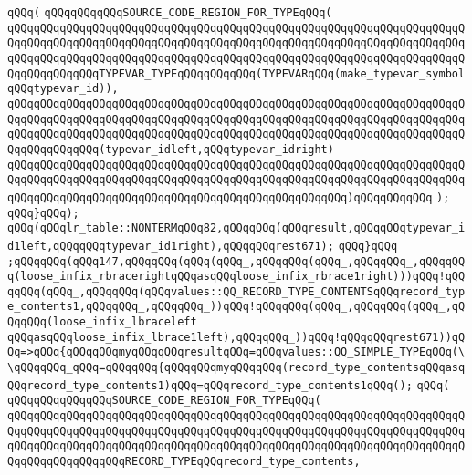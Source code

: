 \verb|qQQq(|\newline
\verb|qQQqqQQqqQQqSOURCE_CODE_REGION_FOR_TYPEqQQq(|\newline
\verb|qQQqqQQqqQQqqQQqqQQqqQQqqQQqqQQqqQQqqQQqqQQqqQQqqQQqqQQqqQQqqQQqqQQqqQQqqQQqqQQqqQQqqQQqqQQqqQQqqQQqqQQqqQQqqQQqqQQqqQQqqQQqqQQqqQQqqQQqqQQqqQQqqQQqqQQqqQQqqQQqqQQqqQQqqQQqqQQqqQQqqQQqqQQqqQQqqQQqqQQqqQQqqQQqqQQqqQQqqQQqqQQqTYPEVAR_TYPEqQQqqQQqqQQq(TYPEVARqQQq(make_typevar_symbolqQQqtypevar_id)),|\newline
\verb|qQQqqQQqqQQqqQQqqQQqqQQqqQQqqQQqqQQqqQQqqQQqqQQqqQQqqQQqqQQqqQQqqQQqqQQqqQQqqQQqqQQqqQQqqQQqqQQqqQQqqQQqqQQqqQQqqQQqqQQqqQQqqQQqqQQqqQQqqQQqqQQqqQQqqQQqqQQqqQQqqQQqqQQqqQQqqQQqqQQqqQQqqQQqqQQqqQQqqQQqqQQqqQQqqQQqqQQqqQQqqQQq(typevar_idleft,qQQqtypevar_idright)|\newline
\verb|qQQqqQQqqQQqqQQqqQQqqQQqqQQqqQQqqQQqqQQqqQQqqQQqqQQqqQQqqQQqqQQqqQQqqQQqqQQqqQQqqQQqqQQqqQQqqQQqqQQqqQQqqQQqqQQqqQQqqQQqqQQqqQQqqQQqqQQqqQQqqQQqqQQqqQQqqQQqqQQqqQQqqQQqqQQqqQQqqQQqqQQqqQQqqQQq)qQQqqQQqqQQq|\newline
\verb|);|\newline
\verb|qQQq}qQQq);|\newline
\verb|qQQq(qQQqlr_table::NONTERMqQQq82,qQQqqQQq(qQQqresult,qQQqqQQqtypevar_id1left,qQQqqQQqtypevar_id1right),qQQqqQQqrest671);|\newline
\verb|qQQq}qQQq|\newline
\verb|;qQQqqQQq(qQQq147,qQQqqQQq(qQQq(qQQq_,qQQqqQQq(qQQq_,qQQqqQQq_,qQQqqQQq(loose_infix_rbracerightqQQqasqQQqloose_infix_rbrace1right)))qQQq!qQQqqQQq(qQQq_,qQQqqQQq(qQQqvalues::QQ_RECORD_TYPE_CONTENTSqQQqrecord_type_contents1,qQQqqQQq_,qQQqqQQq_))qQQq!qQQqqQQq(qQQq_,qQQqqQQq(qQQq_,qQQqqQQq(loose_infix_lbraceleft|\newline
\verb|qQQqasqQQqloose_infix_lbrace1left),qQQqqQQq_))qQQq!qQQqqQQqrest671))qQQq=>qQQq{qQQqqQQqmyqQQqqQQqresultqQQq=qQQqvalues::QQ_SIMPLE_TYPEqQQq(\\qQQqqQQq_qQQq=qQQqqQQq{qQQqqQQqmyqQQqqQQq(record_type_contentsqQQqasqQQqrecord_type_contents1)qQQq=qQQqrecord_type_contents1qQQq();|\newline
\verb|qQQq(|\newline
\verb|qQQqqQQqqQQqqQQqSOURCE_CODE_REGION_FOR_TYPEqQQq(|\newline
\verb|qQQqqQQqqQQqqQQqqQQqqQQqqQQqqQQqqQQqqQQqqQQqqQQqqQQqqQQqqQQqqQQqqQQqqQQqqQQqqQQqqQQqqQQqqQQqqQQqqQQqqQQqqQQqqQQqqQQqqQQqqQQqqQQqqQQqqQQqqQQqqQQqqQQqqQQqqQQqqQQqqQQqqQQqqQQqqQQqqQQqqQQqqQQqqQQqqQQqqQQqqQQqqQQqqQQqqQQqqQQqqQQqqQQqRECORD_TYPEqQQqrecord_type_contents,|\newline
